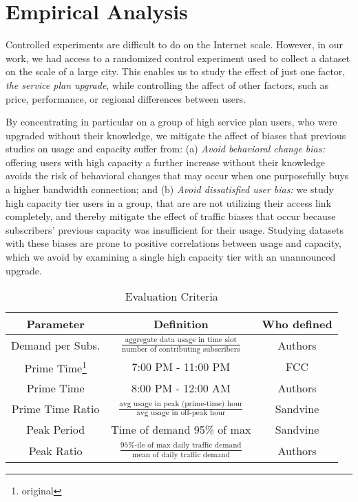 \section{Empirical Analysis}\label{sec:analysis}


Controlled experiments are difficult to do on the Internet scale. However, in 
our work, we had access to a randomized control experiment used to collect a 
dataset on the scale of a large city. This enables us to study the effect of 
just one factor, \emph{the service plan upgrade}, while controlling the affect 
of other factors, such as price, performance, or regional differences between 
users.

By concentrating in particular on a group of high service plan users, who were 
upgraded without their knowledge, we mitigate the affect of biases that 
previous studies on usage and capacity suffer from: (a) \emph{Avoid behavioral 
change bias:} offering users with high capacity a further increase without 
their knowledge avoids the risk of behavioral changes that may occur when one 
purposefully buys a higher bandwidth connection; and (b) \emph{Avoid 
dissatisfied user bias:} we study high capacity tier users in a \control{} 
group, that are are not utilizing their access link completely, and thereby 
mitigate the effect of traffic biases that occur because subscribers' previous 
capacity was insufficient for their usage. Studying datasets with these biases 
are prone to positive correlations between usage and capacity, which we 
avoid by examining a single high capacity tier with an unannounced upgrade.

\begin{table}[ht]
\small 
\begin{tabular}{c|c|c}\hline
\textbf{Parameter} & \textbf{Definition} & \textbf{Who defined}		\\\hline
Demand per Subs.& \(\frac{\text{aggregate data usage in 
time slot}}{\text{number of contributing subscribers}}\) & Authors 	\\
Prime Time\footnote{original}	& 7:00 PM - 11:00 PM		& FCC	\\
Prime Time		& 8:00 PM - 12:00 AM   		& Authors	\\
Prime Time Ratio 	& \( \frac{ \text{avg usage in peak (prime-time) 
hour}}{ \text{avg usage in off-peak hour}}\) 		& Sandvine	\\
Peak Period		& Time of demand 95\% of max    & Sandvine	\\
Peak Ratio 		& \(\frac{\text{95\%-ile of max daily 
traffic demand}}{\text{mean of daily traffic demand}}\)	& Authors 	\\\hline
\end{tabular}
\caption{Evaluation Criteria}
\label{tab:eval-criteria}
\end{table}


